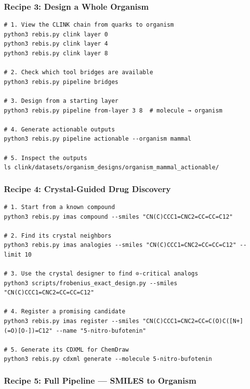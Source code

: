 \hypertarget{recipe-3-design-a-whole-organism}{%
\subsubsection{Recipe 3: Design a Whole
Organism}\label{recipe-3-design-a-whole-organism}}

\begin{verbatim}
# 1. View the CLINK chain from quarks to organism
python3 rebis.py clink layer 0
python3 rebis.py clink layer 4
python3 rebis.py clink layer 8

# 2. Check which tool bridges are available
python3 rebis.py pipeline bridges

# 3. Design from a starting layer
python3 rebis.py pipeline from-layer 3 8  # molecule → organism

# 4. Generate actionable outputs
python3 rebis.py pipeline actionable --organism mammal

# 5. Inspect the outputs
ls clink/datasets/organism_designs/organism_mammal_actionable/
\end{verbatim}

\hypertarget{recipe-4-crystal-guided-drug-discovery}{%
\subsubsection{Recipe 4: Crystal-Guided Drug
Discovery}\label{recipe-4-crystal-guided-drug-discovery}}

\begin{verbatim}
# 1. Start from a known compound
python3 rebis.py imas compound --smiles "CN(C)CCC1=CNC2=CC=CC=C12"

# 2. Find its crystal neighbors
python3 rebis.py imas analogies --smiles "CN(C)CCC1=CNC2=CC=CC=C12" --limit 10

# 3. Use the crystal designer to find ⊙-critical analogs
python3 scripts/frobenius_exact_design.py --smiles "CN(C)CCC1=CNC2=CC=CC=C12"

# 4. Register a promising candidate
python3 rebis.py imas register --smiles "CN(C)CCC1=CNC2=CC=C(O)C([N+](=O)[O-])=C12" --name "5-nitro-bufotenin"

# 5. Generate its CDXML for ChemDraw
python3 rebis.py cdxml generate --molecule 5-nitro-bufotenin
\end{verbatim}

\hypertarget{recipe-5-full-pipeline-smiles-to-organism}{%
\subsubsection{Recipe 5: Full Pipeline --- SMILES to
Organism}\label{recipe-5-full-pipeline-smiles-to-organism}}

